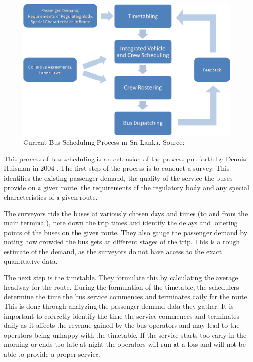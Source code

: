 \documentclass[12pt, oneside]{report}
\begin{document}
\begin{figure}[h!]
\centering
\includegraphics [scale=0.7] {currentBusSchedulingProcess}
\caption[Current Bus Scheduling Process in SL]{Current Bus Scheduling Process in Sri Lanka. Source: \citep{Piyadasa2005}}
\label{image-currentBusSchedulingProcess}
\end{figure}

This process of bus scheduling is an extension of the process put forth by Dennis Huisman in 2004 \citep{Piyadasa2005}. The first step of the process is to conduct a survey. This identifies the existing passenger demand, the quality of the service the buses provide on a given route, the requirements of the regulatory body and any special characteristics of a given route. 

The surveyors ride the buses at variously chosen days and times (to and from the main terminal), note down the trip times and identify the delays and loitering points of the buses on the given route. They also gauge the passenger demand by noting how crowded the bus gets at different stages of the trip. This is a rough estimate of the demand, as the surveyors do not have access to the exact quantitative data.

The next step is the timetable. They formulate this by calculating the average headway for the route. During the formulation of the timetable, the schedulers determine the time the bus service commences and terminates daily for the route. This is done through analyzing the passenger demand data they gather. It is important to correctly identify the time the service commences and terminates daily as it affects the revenue gained by the bus operators and may lead to the operators being unhappy with the timetable. If the service starts too early in the morning or ends too late at night the operators will run at a loss and will not be able to provide a proper service.
\end{document}

